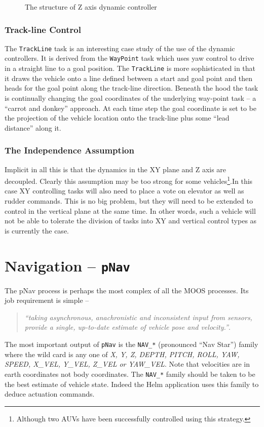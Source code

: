 \documentclass[a4paper,10pt]{article}
\newcommand{\Code}[1]{\texttt{#1} }
\newcommand{\code}[1]{\Code{#1} }
\begin{document}
\begin{figure}[ht]
\label{fig:ZPID} \centering {} \caption{The structure of Z axis dynamic controller}
\end{figure}


\subsubsection{Track-line Control}
The \code{TrackLine} task is an interesting case study of the use
of the dynamic controllers. It is derived from the \code{WayPoint}
task which uses yaw control to drive in a straight line to a goal
position. The \code{TrackLine} is more sophisticated in that it
draws the vehicle onto a line defined between  a start and goal
point and then heads for the goal point along the track-line
direction. Beneath the hood the task is continually changing the
goal coordinates of the underlying way-point task -- a ``carrot
and donkey'' approach. At each time step the goal coordinate is
set to be the projection of the vehicle location onto the
track-line plus some ``lead distance'' along it.

\subsubsection{The Independence Assumption}
Implicit in all this is that the dynamics  in the XY plane and Z
axis are decoupled. Clearly this assumption may be too strong for
some vehicles\footnote{Although two AUVs have been successfully
controlled using this strategy.}.In this case XY controlling tasks
will also need to place a vote on elevator as well as rudder
commands. This is no big problem, but they will need to be
extended to control in the vertical plane at the same time. In
other words, such a vehicle will not be able to tolerate the
division of tasks into XY and vertical control types as is
currently the case.

\newpage
\section{Navigation -- \code{pNav}}
The pNav process is perhaps the most complex of all the MOOS
processes. Its job requirement is simple -- \begin{quote}
{\it{``taking asynchronous, anachronistic and inconsistent input
from sensors, provide a single, up-to-date estimate of vehicle
pose and velocity.''}}. \end{quote} The most important output of
\code{pNav} is the \code{NAV\_*} (pronounced ``Nav Star'') family where
the wild card is any one of {\it{X, Y, Z, DEPTH, PITCH, ROLL, YAW,
SPEED, X\_VEL, Y\_VEL, Z\_VEL or YAW\_VEL}}. Note that velocities
are in earth coordinates not body coordinates. The \code{NAV\_*}
family should be taken to be the best estimate of vehicle state.
Indeed the Helm application uses this family to deduce actuation
commands.
\end{document}
